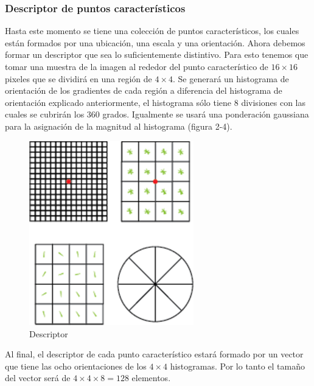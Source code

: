 \subsubsection{Descriptor de puntos característicos}
Hasta este momento se tiene una colección de puntos característicos, los cuales están formados por una ubicación, una escala y una orientación. Ahora debemos formar un descriptor que sea lo suficientemente distintivo. Para esto tenemos que tomar una muestra de la imagen al rededor del punto característico de $16\times16$ pixeles que se dividirá en una región de $4 \times 4$. Se generará un histograma de orientación de los gradientes de cada región a diferencia del histograma de orientación explicado anteriormente, el histograma sólo tiene 8 divisiones con las cuales se cubrirán los 360 grados. Igualmente se usará una ponderación gaussiana para la asignación de la magnitud al histograma (figura 2-4).\\
\begin{figure}[H]
	\centering
		\includegraphics[height=8cm]{img/Descriptor.png}
	\caption{Descriptor}
\end{figure}
Al final, el descriptor de cada punto característico estará formado por un vector que tiene las ocho orientaciones de los $4\times4$ histogramas. Por lo tanto el tamaño del vector será de $4\times4\times8 = 128$ elementos.\\
